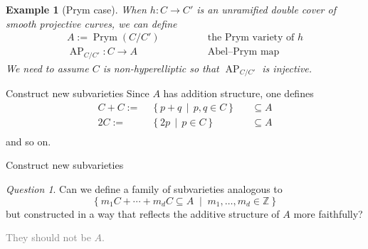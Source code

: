 \documentclass[pdf]{beamer}
\numberwithin{equation}{section}
\theoremstyle{plain}
\newtheorem{eg}[theorem]{Example}
\theoremstyle{plain}
\theoremstyle{remark}
\newtheorem{remark}[theorem]{Remark}
\newtheorem{question}[theorem]{Question}
\newcommand*{\ignore}[1]{\textcolor{gray}{#1}}
\DeclareMathOperator{\Prym}{\operatorname{Prym}}
\DeclareMathOperator{\AP}{\operatorname{AP}}
\begin{document}
\begin{frame}[fragile]
\begin{overlayarea}{\textwidth}{8cm}
{
\begin{eg}[Prym case]
When $h:C \longrightarrow C'$ is an unramified double cover of smooth projective curves, we can define
\begin{equation*}
\begin{aligned}
 A:=\Prym(C/C') &\qquad\qquad \text{the Prym variety of $h$}  \\ 
 \AP_{C/C'}:C \longrightarrow A &\qquad\qquad \text{Abel--Prym map}
\end{aligned}
\end{equation*}
We need to assume $C$ is non-hyperelliptic so that $\AP_{C/C'}$ is injective.
\end{eg}
}
\end{overlayarea}
\end{frame}


\begin{frame}[fragile]{Construct new subvarieties}
Since $A$ has addition structure, one defines
\begin{equation*}
\begin{aligned}
  C+C:=\;& \left\{ p+q \,\middle|\, p,q \in C  \right\} &&\subseteq A  \\ 
  2C:=\;& \left\{ 2p \,\middle|\, p \in C  \right\} &&\subseteq A  \\ 
\end{aligned}
\end{equation*}
and so on.
\end{frame}

\begin{frame}[fragile]{Construct new subvarieties}
\begin{question}
Can we define a family of subvarieties analogous to
$$\left\{ m_1C+ \cdots + m_dC \subseteq A  \;\middle|\; m_1,\ldots,m_d \in \mathbb{Z} \right\}$$
but constructed in a way that reflects the additive structure of $A$ more faithfully?

\ignore{They should not be $A$.}
\end{question}
\end{frame}
\end{document}
